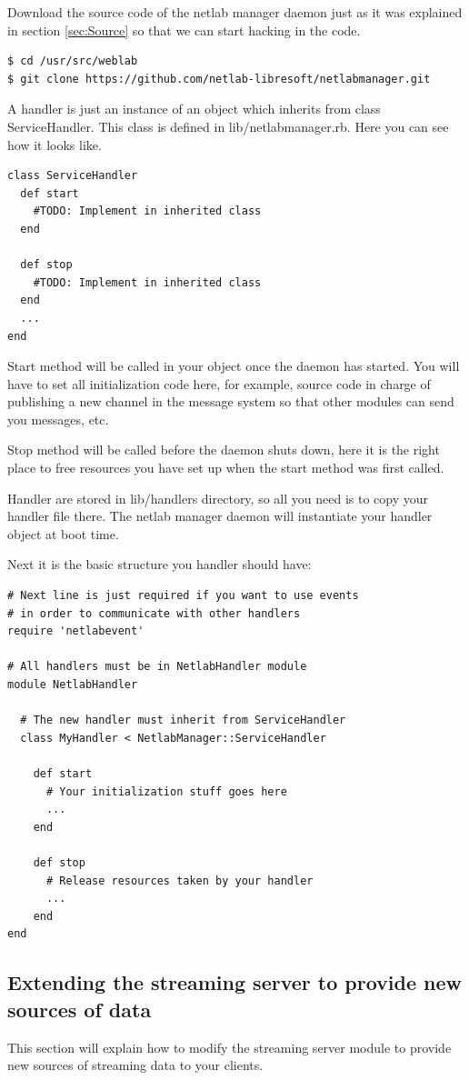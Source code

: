\documentclass{article}
\begin{document}
Download the source code of the netlab manager daemon just as it was explained in section \ref{sec:Source} so that we can start hacking in the code.

\begin{verbatim}
$ cd /usr/src/weblab
$ git clone https://github.com/netlab-libresoft/netlabmanager.git
\end{verbatim}

A handler is just an instance of an object which inherits from class ServiceHandler. This class is defined in lib/netlabmanager.rb. Here you can see how it looks like.

\begin{verbatim}
class ServiceHandler
  def start
    #TODO: Implement in inherited class
  end

  def stop
    #TODO: Implement in inherited class
  end
  ...
end
\end{verbatim}

Start method will be called in your object once the daemon has started. You will have to set all initialization code here, for example, source code in charge of publishing a new channel in the message system so that other modules can send you messages, etc.

Stop method will be called before the daemon shuts down, here it is the right place to free resources you have set up when the start method was first called.

Handler are stored in lib/handlers directory, so all you need is to copy your handler file there. The netlab manager daemon will instantiate your handler object at boot time.

Next it is the basic structure you handler should have:

\begin{verbatim}
# Next line is just required if you want to use events 
# in order to communicate with other handlers
require 'netlabevent'

# All handlers must be in NetlabHandler module
module NetlabHandler

  # The new handler must inherit from ServiceHandler
  class MyHandler < NetlabManager::ServiceHandler
  
    def start
      # Your initialization stuff goes here
      ...
    end
    
    def stop
      # Release resources taken by your handler
      ...
    end
end
\end{verbatim}

\subsection{Extending the streaming server to provide new sources of data}
This section will explain how to modify the streaming server module to provide new sources of streaming data to your clients.
\end{document}
